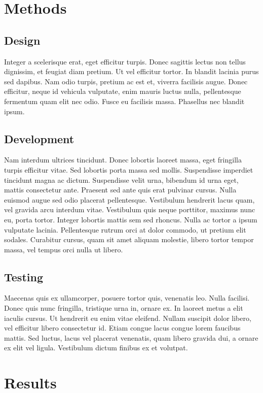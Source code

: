 \section{Methods}

\subsection{Design}
Integer a scelerisque erat, eget efficitur turpis. Donec sagittis lectus non tellus dignissim, et feugiat diam pretium. Ut vel efficitur tortor. In blandit lacinia purus sed dapibus. Nam odio turpis, pretium ac est et, viverra facilisis augue. Donec efficitur, neque id vehicula vulputate, enim mauris luctus nulla, pellentesque fermentum quam elit nec odio. Fusce eu facilisis massa. Phasellus nec blandit ipsum.

\subsection{Development}
Nam interdum ultrices tincidunt. Donec lobortis laoreet massa, eget fringilla turpis efficitur vitae. Sed lobortis porta massa sed mollis. Suspendisse imperdiet tincidunt magna ac dictum. Suspendisse velit urna, bibendum id urna eget, mattis consectetur ante. Praesent sed ante quis erat pulvinar cursus. Nulla euismod augue sed odio placerat pellentesque. Vestibulum hendrerit lacus quam, vel gravida arcu interdum vitae. Vestibulum quis neque porttitor, maximus nunc eu, porta tortor. Integer lobortis mattis sem sed rhoncus. Nulla ac tortor a ipsum vulputate lacinia. Pellentesque rutrum orci at dolor commodo, ut pretium elit sodales. Curabitur cursus, quam sit amet aliquam molestie, libero tortor tempor massa, vel tempus orci nulla ut libero.

\subsection{Testing}
Maecenas quis ex ullamcorper, posuere tortor quis, venenatis leo. Nulla facilisi. Donec quis nunc fringilla, tristique urna in, ornare ex. In laoreet metus a elit iaculis cursus. Ut hendrerit eu enim vitae eleifend. Nullam suscipit dolor libero, vel efficitur libero consectetur id. Etiam congue lacus congue lorem faucibus mattis. Sed luctus, lacus vel placerat venenatis, quam libero gravida dui, a ornare ex elit vel ligula. Vestibulum dictum finibus ex et volutpat.


\section{Results}

